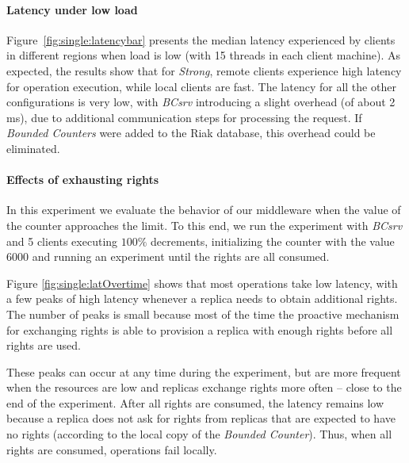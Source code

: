 \documentclass[conference]{IEEEtran}
\newcommand{\InvCounter}{\emph{Bounded Counter}}
\newcommand{\InvCounters}{\emph{Bounded Counters}}
\begin{document}
\paragraph{Latency under low load}
Figure~\ref{fig:single:latencybar} presents the median latency experienced by clients in different
regions when load is low (with 15 threads in each client machine).
As expected, the results show that for \emph{Strong}, remote clients experience high latency 
for operation execution, while local clients are fast.
The latency for all the other configurations is very low, with \emph{BCsrv} introducing a
slight overhead (of about 2 ms), due to additional communication steps for processing the request. 
If \InvCounters{} were added to the Riak database, this overhead could be eliminated. 

 












\paragraph{Effects of exhausting rights}
In this experiment we evaluate the behavior of our middleware when the
value of the counter approaches the limit.
To this end, we run the experiment with \emph{BCsrv} and 5 clients executing $100\%$ decrements, 
initializing the counter with the value 6000 and running an experiment  
until the rights are all consumed. 

Figure \ref{fig:single:latOvertime} shows that most operations take low latency, with a few 
peaks of high latency whenever a replica needs to obtain additional rights.
The number of peaks is small because most of the time the proactive mechanism 
for exchanging rights is able to provision a replica with enough rights before 
all rights are used. 

These peaks can occur at any time during the experiment, but are more frequent when
the resources are low and replicas exchange rights more often -- close to 
the end of the experiment. 
After all rights are consumed, the latency remains low because a replica 
does not ask for rights from replicas that are expected to have no rights (according
to the local copy of the \InvCounter{}). Thus, when all rights are consumed,
operations fail locally. 
\end{document}

